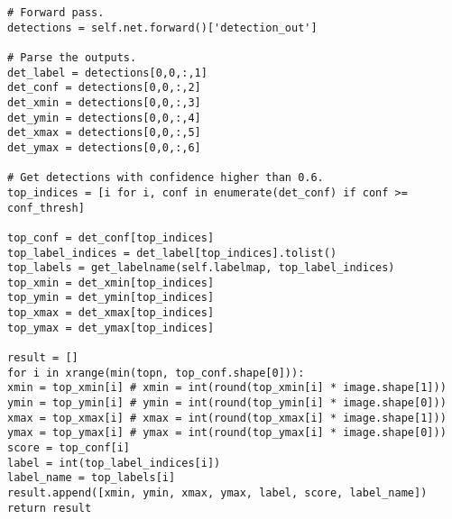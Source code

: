 \documentclass[12pt,paper=a4]{report}
\begin{document}
\begin{lstlisting}[basicstyle=\tiny]
# Forward pass.
detections = self.net.forward()['detection_out']

# Parse the outputs.
det_label = detections[0,0,:,1]
det_conf = detections[0,0,:,2]
det_xmin = detections[0,0,:,3]
det_ymin = detections[0,0,:,4]
det_xmax = detections[0,0,:,5]
det_ymax = detections[0,0,:,6]

# Get detections with confidence higher than 0.6.
top_indices = [i for i, conf in enumerate(det_conf) if conf >= conf_thresh]

top_conf = det_conf[top_indices]
top_label_indices = det_label[top_indices].tolist()
top_labels = get_labelname(self.labelmap, top_label_indices)
top_xmin = det_xmin[top_indices]
top_ymin = det_ymin[top_indices]
top_xmax = det_xmax[top_indices]
top_ymax = det_ymax[top_indices]

result = []
for i in xrange(min(topn, top_conf.shape[0])):
xmin = top_xmin[i] # xmin = int(round(top_xmin[i] * image.shape[1]))
ymin = top_ymin[i] # ymin = int(round(top_ymin[i] * image.shape[0]))
xmax = top_xmax[i] # xmax = int(round(top_xmax[i] * image.shape[1]))
ymax = top_ymax[i] # ymax = int(round(top_ymax[i] * image.shape[0]))
score = top_conf[i]
label = int(top_label_indices[i])
label_name = top_labels[i]
result.append([xmin, ymin, xmax, ymax, label, score, label_name])
return result


\end{lstlisting}
\end{document}
